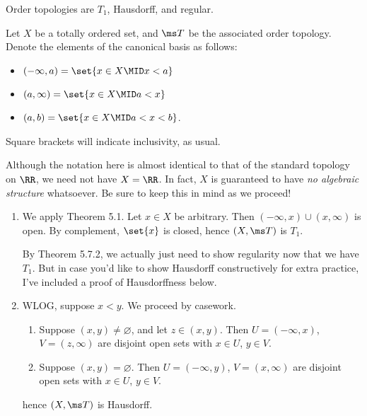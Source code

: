 \documentclass{fkpset}
\begin{document}
  \begin{problem}[5.15]
    Order topologies are $T_1$, Hausdorff, and regular.
  \end{problem}
  \begin{solution}
    Let $X$ be a totally ordered set, and $\ms T$ be the associated
    order topology. Denote the elements of the canonical basis as
    follows:
    \begin{itemize}
      \item $(-\infty, a) = \set{x \in X \MID x < a}$
      \item $(a, \infty) = \set{x \in X \MID a < x}$
      \item $(a,b) = \set{x \in X \MID a < x < b}$.
    \end{itemize}
    Square brackets will indicate inclusivity, as usual.
    \begin{note}
      \color{red} Although the notation here is almost identical to
      that of the standard topology on $\RR$, we need not have $X =
      \RR$. In fact, $X$ is guaranteed to have \emph{no algebraic
        structure} whatsoever. Be sure to keep this in mind as we
      proceed!
    \end{note}

    \begin{enumerate}[label=(\arabic*)]
      \item We apply Theorem 5.1. Let $x \in X$ be arbitrary. Then
        $(-\infty, x) \cup (x, \infty)$ is open. By complement,
        $\set{x}$ is closed, hence $(X,\ms T)$ is $T_1$.
        \begin{remark}
          {\color{red} By Theorem 5.7.2, we actually just need to show
            regularity now that we have $T_1$. But in case you'd like
            to show Hausdorff constructively for extra practice, I've
            included a proof of Hausdorffness below.}
        \end{remark}
      \item WLOG, suppose $x < y$. We proceed by casework.
        \begin{enumerate}[label=(\roman*)]
          \item Suppose $(x,y) \neq \varnothing$, and let $z \in
            (x,y)$. Then $U = (-\infty, x)$, $V = (z, \infty)$ are
            disjoint open sets with $x \in U$, $y \in V$.
          \item Suppose $(x,y) = \varnothing$. Then $U = (-\infty,
            y)$, $V = (x, \infty)$ are disjoint open sets with $x \in
            U$, $y \in V$.
        \end{enumerate}
        hence $(X, \ms T)$ is Hausdorff.
        \begin{figure}[H]
          \centering
\end{figure}
\end{enumerate}
\end{solution}
\end{document}
